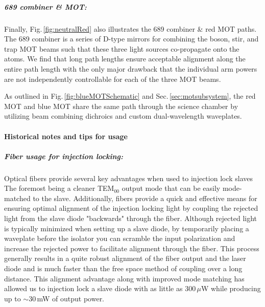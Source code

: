 \subparagraph{689 combiner \& MOT:}
Finally, Fig.\,\ref{fig:neutralRed} also illustrates the 689 combiner \& red MOT paths.
The 689 combiner is a series of D-type mirrors for combining the boson, stir, and trap MOT beams such that these three light sources co-propagate onto the atoms.
We find that long path lengths ensure acceptable alignment along the entire path length with the only major drawback that the individual arm powers are not independently controllable for each of the three MOT beams.

As outlined in Fig.\,\ref{fig:blueMOTSchematic} and Sec.\,\ref{sec:motsubsystem}, the red MOT and blue MOT share the same path through the science chamber by utilizing beam combining dichroics and custom dual-wavelength waveplates.

\paragraph{Historical notes and tips for usage}
\subparagraph{Fiber usage for injection locking:}
Optical fibers provide several key advantages when used to injection lock slaves
The foremost being a cleaner TEM$_{00}$ output mode that can be easily mode-matched to the slave. 
Additionally, fibers provide a quick and effective means for ensuring optimal alignment of the injection locking light by coupling the rejected light from the slave diode "backwards" through the fiber. 
Although rejected light is typically minimized when setting up a slave diode, by temporarily placing a waveplate before the isolator you can scramble the input polarization and increase the rejected power to facilitate alignment through the fiber. 
This process generally results in a quite robust alignment of the fiber output and the laser diode and is much faster than the free space method of coupling over a long distance. 
This alignment advantage along with improved mode matching has allowed us to injection lock a slave diode with as little as 300\,$\mu$W while producing up to $\sim$30\,mW of output power.

